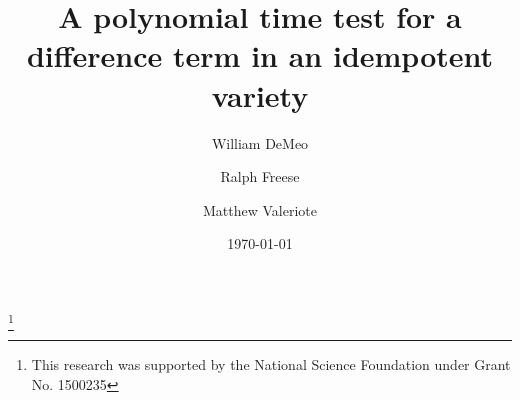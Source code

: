 \usepackage[yyyymmdd,hhmmss]{datetime}
\usepackage{background}


\usepackage{pdfcomment}
\usepackage{color}
\usepackage{amsmath}
\usepackage{amsfonts}
\usepackage{amscd}
\usepackage{inputs/rflatexmacs}
\usepackage{inputs/wjdlatexmacs}

\usepackage[mathcal]{euscript}
\usepackage{comment}

\renewcommand{\th}[2]{#1\mathrel{\theta}#2}
\newcommand{\infixrel}[3]{#2\mathrel{#1}#3}


\newtheorem{theorem}{Theorem}
\newtheorem{lemma}[theorem]{Lemma}
\newtheorem{corollary}[theorem]{Corollary}
\newtheorem{prop}[theorem]{Proposition}
\newtheorem{conjecture}[theorem]{Conjecture}
\theoremstyle{definition}
\newtheorem{example}[theorem]{Example}
\newtheorem{fact}[theorem]{Fact}
\newtheorem{remark}{Remark}
\newtheorem*{remarks}{Remarks}
\newtheorem*{rem}{Remark}
\newtheorem{prob}{Problem}

\title[A test for a difference term]{A polynomial time test for a
difference term in an idempotent variety}
\author[DeMeo]{William DeMeo}
\address[William DeMeo]{
Department of Mathematics\\
University of Hawaii\\
Honolulu, Hawaii\\
96822 USA}
\author[Freese]{Ralph Freese}
\address[Ralph Freese]{
Department of Mathematics\\
University of Hawaii\\
Honolulu, Hawaii\\
96822 USA}
\author[Valeriote]{Matthew Valeriote}
\address[Matthew Valeriote]{
Department of Mathematics\\
McMaster University\\
Hamilton, Ontario\\
xxxxx Canada}

\thanks{This research was supported by the National
Science Foundation under Grant No. 1500235}

\date{\today}



\maketitle 

